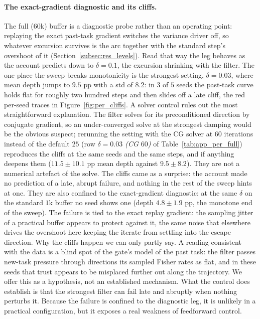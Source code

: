 \paragraph{The exact-gradient diagnostic and its cliffs.} The full ($60$k) buffer is a diagnostic probe rather than an operating point: replaying the exact past-task gradient switches the variance driver off, so whatever excursion survives is the arc together with the standard step's overshoot of it (Section~\ref{subsec:res_levels}). Read that way the leg behaves as the account predicts down to $\delta = 0.1$, the excursion shrinking with the filter. The one place the sweep breaks monotonicity is the strongest setting, $\delta = 0.03$, where mean depth jumps to $9.5$ pp with a std of $8.2$: in $3$ of $5$ seeds the past-task curve holds flat for roughly two hundred steps and then slides off a late cliff, the red per-seed traces in Figure~\ref{fig:per_cliffs}. A solver control rules out the most straightforward explanation. The filter solves for its preconditioned direction by conjugate gradient, so an under-converged solve at the strongest damping would be the obvious suspect; rerunning the setting with the CG solver at $60$ iterations instead of the default $25$ (row \emph{$\delta{=}0.03$ (CG $60$)} of Table~\ref{tab:app_per_full}) reproduces the cliffs at the same seeds and the same steps, and if anything deepens them ($11.5 \pm 10.1$ pp mean depth against $9.5 \pm 8.2$). They are not a numerical artefact of the solve. The cliffs came as a surprise: the account made no prediction of a late, abrupt failure, and nothing in the rest of the sweep hints at one. They are also confined to the exact-gradient diagnostic: at the same $\delta$ on the standard $1$k buffer no seed shows one (depth $4.8 \pm 1.9$ pp, the monotone end of the sweep). The failure is tied to the exact replay gradient: the sampling jitter of a practical buffer appears to protect against it, the same noise that elsewhere drives the overshoot here keeping the iterate from settling into the escape direction. Why the cliffs happen we can only partly say. A reading consistent with the data is a blind spot of the gate's model of the past task: the filter passes new-task pressure through directions its sampled Fisher rates as flat, and in these seeds that trust appears to be misplaced further out along the trajectory. We offer this as a hypothesis, not an established mechanism. What the control does establish is that the strongest filter can fail late and abruptly when nothing perturbs it. Because the failure is confined to the diagnostic leg, it is unlikely in a practical configuration, but it exposes a real weakness of feedforward control.

